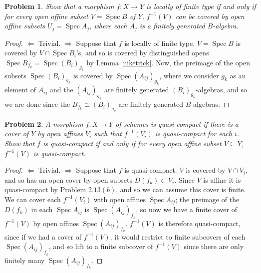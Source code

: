 \documentclass[12pt,letterpaper]{article}
\newtheorem{problem}{Problem}[section]
\theoremstyle{definition}
\theoremstyle{remark}
\numberwithin{equation}{section}
\numberwithin{figure}{problem}
\DeclareMathOperator{\Spec}{Spec}
\begin{document}
\begin{problem}
  Show that a morphism $f \colon X \to Y$ is locally of finite type if and only if for \emph{every} open affine subset $V = \Spec B$ of $Y$, $f^{-1}(V)$ can be covered by open affine subsets $U_j = \Spec A_j$, where each $A_j$ is a finitely generated $B$-algebra.
\end{problem}
\begin{proof}
  $\Leftarrow$ Trivial. $\Rightarrow$ Suppose that $f$ is locally of finite type. $V = \Spec B$ is covered by $V \cap \Spec B_i$'s, and so is covered by distinguished opens $\Spec B_{f_k} = \Spec (B_i)_{g_k}$ by Lemma \ref{niketrick}. Now, the preimage of the open subsets $\Spec (B_i)_{g_k}$ is covered by $\Spec (A_{ij})_{g_k}$, where we consider $g_k$ as an element of $A_{ij}$ and the $(A_{ij})_{g_k}$ are finitely generated $(B_i)_{g_k}$-algebras, and so we are done since the $B_{f_k} \cong (B_i)_{g_k}$ are finitely generated $B$-algebras.
\end{proof}

\begin{problem}
  A morphism $f\colon X \to Y$ of schemes is \emph{quasi-compact} if there is a cover of $Y$ by open affines $V_i$ such that $f^{-1}(V_i)$ is quasi-compact for each $i$. Show that $f$ is quasi-compact if and only if for \emph{every} open affine subset $V \subseteq Y$, $f^{-1}(V)$ is quasi-compact.
\end{problem}
\begin{proof}
  $\Leftarrow$ Trivial. $\Rightarrow$ Suppose that $f$ is quasi-compact. $V$ is covered by $V \cap V_i$, and so has an open cover by open subsets $D(f_k) \subset V_i$. Since $V$ is affine it is quasi-compact by Problem $2.13(b)$, and so we can assume this cover is finite. We can cover each $f^{-1}(V_i)$ with open affines $\Spec A_{ij}$; the preimage of the $D(f_k)$ in each $\Spec A_{ij}$ is $\Spec (A_{ij})_{f_k}$, so now we have a finite cover of $f^{-1}(V)$ by open affines $\Spec (A_{ij})_{f_k}$. $f^{-1}(V)$ is therefore quasi-compact, since if we had a cover of $f^{-1}(V)$, it would restrict to finite subcovers of each $\Spec (A_{ij})_{f_k}$, and so lift to a finite subcover of $f^{-1}(V)$ since there are only finitely many $\Spec (A_{ij})_{f_k}$.
\end{proof}
\end{document}
